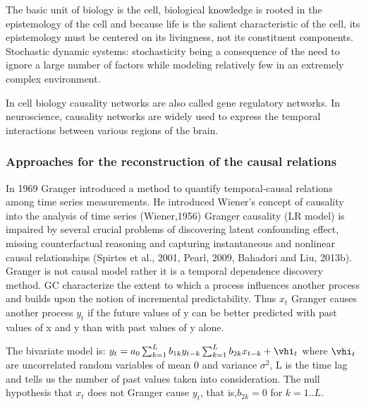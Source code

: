 \documentclass[onecollarge,runningheads]{svjour2}
\begin{document}
The basic unit of biology is the cell, biological knowledge is rooted in the epistemology of the cell and because life is the salient characteristic of the cell, its epistemology must be centered on its livingness, not its constituent components.
Stochastic dynamic systems: stochasticity being a consequence of the need to ignore a large number of factors while modeling relatively few in an extremely complex environment.

In cell biology causality networks are also called gene regulatory networks. In neuroscience, causality networks are widely used to express the temporal interactions between various regions of the brain.
\subsubsection{Approaches for the reconstruction of the causal relations}

In 1969 Granger introduced a method to quantify temporal-causal relations among time series measurements. He introduced Wiener’s concept of causality into the analysis of time series (Wiener,1956)
Granger causality (LR model) is impaired by several crucial problems of discovering latent confounding effect, missing counterfactual reasoning and capturing instantaneous and nonlinear causal relationships (Spirtes et al., 2001, Pearl, 2009, Bahadori and Liu, 2013b).
Granger is not causal model rather it is a temporal dependence discovery method.
GC characterize the extent to which a process influences another process and builds upon the notion of incremental predictability. Thus $x_t$ Granger causes another process $y_t$ if the future values of y can be better predicted with past values of x and y than with past values of y alone.

The bivariate model is:
$y_t = a_0 \sum_{k=1}^{L}b_{1k}y_{t-k} \sum_{k=1}^{L}b_{2k}x_{t-k} + \vhi_t$
where $\vhi_t$ are uncorrelated random  variables of mean 0 and variance $\sigma^2$, L is the time lag and tells us the number of past values taken into consideration. The null hypothesis that $x_t$ does not Granger cause $y_t$, that is,$b_{2k} = 0$ for $k=1..L$.
\end{document}
